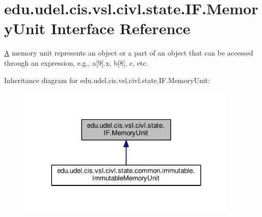 \hypertarget{interfaceedu_1_1udel_1_1cis_1_1vsl_1_1civl_1_1state_1_1IF_1_1MemoryUnit}{}\section{edu.\+udel.\+cis.\+vsl.\+civl.\+state.\+I\+F.\+Memory\+Unit Interface Reference}
\label{interfaceedu_1_1udel_1_1cis_1_1vsl_1_1civl_1_1state_1_1IF_1_1MemoryUnit}


\hyperlink{structA}{A} memory unit represents an object or a part of an object that can be accessed through an expression, e.\+g., a\mbox{[}9\mbox{]}.x, b\mbox{[}8\mbox{]}, c, etc.  




Inheritance diagram for edu.\+udel.\+cis.\+vsl.\+civl.\+state.\+I\+F.\+Memory\+Unit\+:
\nopagebreak
\begin{figure}[H]
\begin{center}
\leavevmode
\includegraphics[width=299pt]{interfaceedu_1_1udel_1_1cis_1_1vsl_1_1civl_1_1state_1_1IF_1_1MemoryUnit__inherit__graph}
\end{center}
\end{figure}
